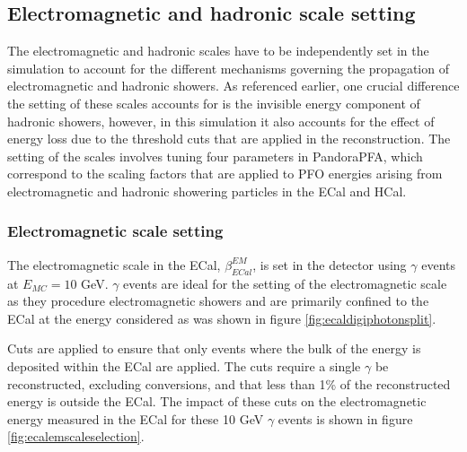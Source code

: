 \subsection{Electromagnetic and hadronic scale setting}
The electromagnetic and hadronic scales have to be independently set in the simulation to account for the different mechanisms governing the propagation of electromagnetic and hadronic showers.  As referenced earlier, one crucial difference the setting of these scales accounts for is the invisible energy component of hadronic showers, however, in this simulation it also accounts for the effect of energy loss due to the threshold cuts that are applied in the reconstruction.  The setting of the scales involves tuning four parameters in PandoraPFA, which correspond to the scaling factors that are applied to PFO energies arising from electromagnetic and hadronic showering particles in the ECal and HCal.  


\subsubsection{Electromagnetic scale setting}
\label{sec:emscalesetting}
The electromagnetic scale in the ECal, $\beta^{EM}_{ECal}$, is set in the detector using $\gamma$ events at $E_{MC} = 10$ GeV.  $\gamma$ events are ideal for the setting of the electromagnetic scale as they procedure electromagnetic showers and are primarily confined to the ECal at the energy considered as was shown in figure \ref{fig:ecaldigiphotonsplit}.  

Cuts are applied to ensure that only events where the bulk of the energy is deposited within the ECal are applied.  The cuts require a single $\gamma$ be reconstructed, excluding conversions, and that less than 1\% of the reconstructed energy is outside the ECal.  The impact of these cuts on the electromagnetic energy measured in the ECal for these 10 GeV $\gamma$ events is shown in figure \ref{fig:ecalemscaleselection}.

